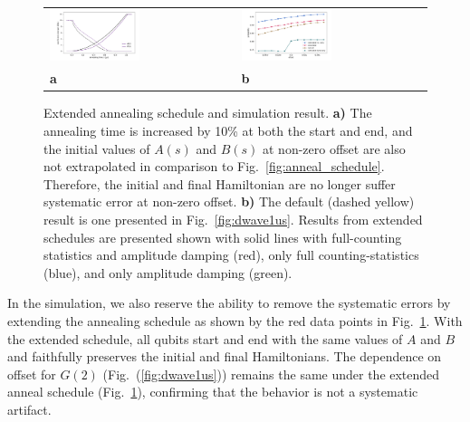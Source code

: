 \documentclass[prd,twocolumn,tightenlines,preprintnumbers,showpacs,superscriptaddress,notitlepage,nofootinbib,eqsecnum,floatfix,longbibliography,aps,10pt]{revtex4-2}
\begin{document}
\begin{figure}
    \centering
	\begin{tabular}{p{}p{}}
	\includegraphics[width=0.5\textwidth]{./new_figures/anneal_schedule_extended.pdf}
    &
	\includegraphics[width=0.5\textwidth]{./new_figures/NN2_offset_scaling_extended.pdf}\\
	\centering \textbf{a} & \centering \textbf{b}
	\end{tabular}
	\centering
	\caption{Extended annealing schedule and simulation result. \textbf{a)} The annealing time is increased by 10\% at both the start and end, and the initial values of $A(s)$ and $B(s)$ at non-zero offset are also not extrapolated in comparison to Fig.~\ref{fig:anneal_schedule}. Therefore, the initial and final Hamiltonian are no longer suffer systematic error at non-zero offset. \textbf{b)} The default (dashed yellow) result is one presented in Fig.~\ref{fig:dwave1us}. Results from extended schedules are presented shown with solid lines with full-counting statistics and amplitude damping (red), only full counting-statistics (blue), and only amplitude damping (green).
    }
	\label{fig:anneal_schedule_ext}
\end{figure}

In the simulation, we also reserve the ability to remove the systematic errors by extending the annealing schedule as shown by the red data points in Fig.~\ref{fig:anneal_schedule_ext}. With the extended schedule, all qubits start and end with the same values of $A$ and $B$ and faithfully preserves the initial and final Hamiltonians. The dependence on offset for $G(2)$ (Fig.~(\ref{fig:dwave1us})) remains the same under the extended anneal schedule (Fig.~\ref{fig:anneal_schedule_ext}), confirming that the behavior is not a systematic artifact.
\end{document}

